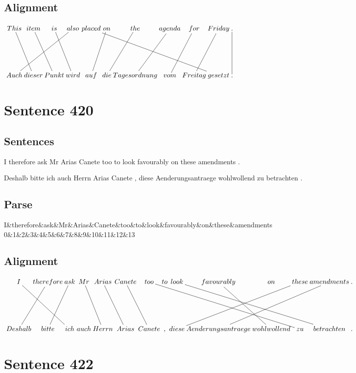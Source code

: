 \documentclass{report}
\begin{document}
\subsection*{Alignment}
\scriptsize{
$
\xymatrix@C-2.3pc{
This \ar @{-} [ddr] & item \ar @{-} [ddr] & is \ar @{-} [ddr] & also \ar @{-} [ddlll] & placed \ar @{-} [ddrrrrr] & on \ar @{-} [ddl] & the \ar @{-} [ddl] & agenda \ar @{-} [ddl] & for \ar @{-} [ddl] & Friday \ar @{-} [ddl] & . \ar @{-} [dd]\\\\
Auch & dieser & Punkt & wird & auf & die & Tagesordnung & vom & Freitag & gesetzt & .
}$}
\newpage\section*{Sentence 420}

\subsection*{Sentences}
I therefore ask Mr Arias Canete too to look favourably on these amendments .

\noindent Deshalb bitte ich auch Herrn Arias Canete , diese Aenderungsantraege wohlwollend zu betrachten .



\subsection*{Parse}
\begin{dependency}[theme=simple]
\begin{deptext}[column sep=.5cm, row sep=.1ex]
I\&therefore\&ask\&Mr\&Arias\&Canete\&too\&to\&look\&favourably\&on\&these\&amendments\\
0\&1\&2\&3\&4\&5\&6\&7\&8\&9\&10\&11\&12\&13\\
\end{deptext}
\end{dependency}


\subsection*{Alignment}
\scriptsize{
$
\xymatrix@C-2.3pc{
I \ar @{-} [ddrr] & therefore \ar @{-} [ddl] & ask \ar @{-} [ddl] & Mr \ar @{-} [ddr] & Arias \ar @{-} [ddr] & Canete \ar @{-} [ddr] & too \ar @{-} [ddrrrrr] & to & look \ar @{-} [ddrrrr] & favourably \ar @{-} [ddr] & on & these \ar @{-} [ddlll] & amendments \ar @{-} [ddlll] & .\\\\
Deshalb & bitte & ich & auch & Herrn & Arias & Canete & , & diese & Aenderungsantraege & wohlwollend & zu & betrachten & .
}$}
\newpage\section*{Sentence 422}
\end{document}
